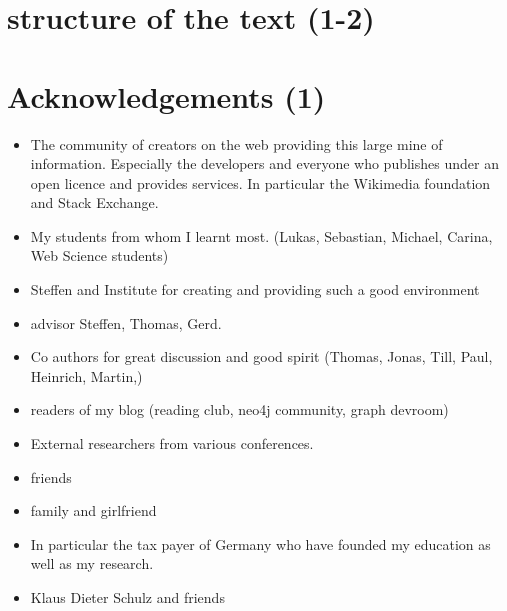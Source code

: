 \documentclass[•]{book}
\begin{document}
\section{structure of the text (1-2)}

\section{Acknowledgements (1)}
\begin{itemize}
\item The community of creators on the web providing this large mine of information. Especially the developers and everyone who publishes under an open licence and provides services. In particular the Wikimedia foundation and Stack Exchange. 
\item My students from whom I learnt most. (Lukas, Sebastian, Michael, Carina, Web Science students)
\item Steffen and Institute for creating and providing such a good environment
\item advisor Steffen, Thomas, Gerd.
\item Co authors for great discussion and good spirit (Thomas, Jonas, Till, Paul, Heinrich, Martin,)
\item readers of my blog (reading club, neo4j community, graph devroom)
\item External researchers from various conferences.\item friends
\item family and girlfriend
\item In particular the tax payer of Germany who have founded my education as well as my research.
\item Klaus Dieter Schulz and friends

\end{itemize}

\newcommand{\intersection}{\cap}
\newcommand{\union}{\cup}
\newcommand{\skp}{\_}
\newcommand{\pow}[1]{2^{#1}}


\end{document}
